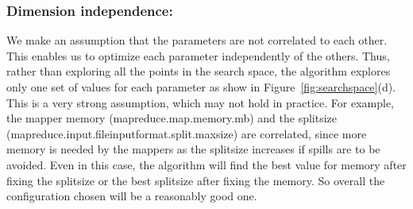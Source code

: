 \noindent\subsubsection*{\bf Dimension independence: } 
We make an assumption that the parameters are not correlated to each other. This enables us to optimize each parameter independently of the others. Thus, rather than exploring all the points in the search space, the algorithm explores only one set of values for each parameter as show in Figure~\ref{fig:searchspace}(d). This is a very strong assumption, which may not hold in practice. For example, the mapper memory (mapreduce.map.memory.mb) and the splitsize (mapreduce.input.fileinputformat.split.maxsize) are correlated, since more memory is needed by the mappers as the splitsize increases if spills are to be avoided. Even in this case, the algorithm will find the best value for memory after fixing the splitsize or the best splitsize after fixing the memory. So overall the configuration chosen will be a reasonably good one.

